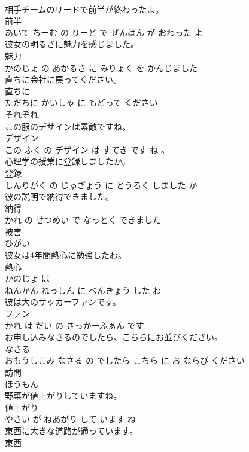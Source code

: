 \documentclass[8pt]{extreport}
\begin{document}
\begin{CJK}{UTF8}{min}
\\	相手チームのリードで前半が終わったよ。	
\\	前半 
\\	あいて ちーむ の りーど で ぜんはん が おわった よ			
\\	彼女の明るさに魅力を感じました。	
\\	魅力 
\\	かのじょ の あかるさ に みりょく を かんじました			
\\	直ちに会社に戻ってください。	
\\	直ちに 
\\	ただちに かいしゃ に もどって ください			
\\	それぞれ	
\\	この服のデザインは素敵ですね。	
\\	デザイン 
\\	この ふく の デザイン は すてき です ね 。			
\\	心理学の授業に登録しましたか。	
\\	登録 
\\	しんりがく の じゅぎょう に とうろく しました か			
\\	彼の説明で納得できました。	
\\	納得 
\\	かれ の せつめい で なっとく できました			
\\	被害	
\\	ひがい			
\\	彼女は4年間熱心に勉強したわ。	
\\	熱心 
\\	かのじょ は 
\\	ねんかん ねっしん に べんきょう した わ			
\\	彼は大のサッカーファンです。	
\\	ファン 
\\	かれ は だい の さっかーふぁん です			
\\	お申し込みなさるのでしたら、こちらにお並びください。	
\\	なさる 
\\	おもうしこみ なさる の でしたら こちら に お ならび ください			
\\	訪問	
\\	ほうもん			
\\	野菜が値上がりしていますね。	
\\	値上がり 
\\	やさい が ねあがり して います ね			
\\	東西に大きな道路が通っています。	
\\	東西 

\end{CJK}
\end{document}
